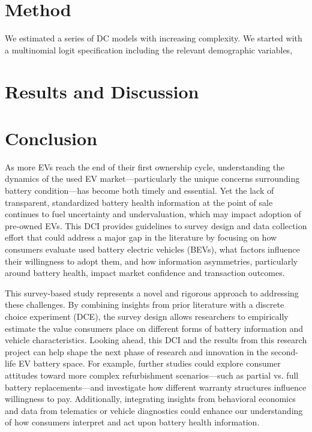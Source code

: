 \documentclass[a4paper,fleqn]{cas-sc}   %
\begin{document}
\section{Method}

We estimated a series of DC models with increasing complexity. We started with a multinomial logit specification including the relevant demographic variables,

\section{Results and Discussion}

\section{Conclusion}
As more EVs reach the end of their first ownership cycle, understanding the dynamics of the used EV market—particularly the unique concerns surrounding battery condition—has become both timely and essential. Yet the lack of transparent, standardized battery health information at the point of sale continues to fuel uncertainty and undervaluation, which may impact adoption of pre-owned EVs. This DCI provides guidelines to survey design and data collection effort that could address a major gap in the literature by focusing on how consumers evaluate used battery electric vehicles (BEVs), what factors influence their willingness to adopt them, and how information asymmetries, particularly around battery health, impact market confidence and transaction outcomes.

This survey-based study represents a novel and rigorous approach to addressing these challenges. By combining insights from prior literature with a discrete choice experiment (DCE), the survey design allows researchers to empirically estimate the value consumers place on different forms of battery information and vehicle characteristics. Looking ahead, this DCI and the results from this research project can help shape the next phase of research and innovation in the second-life EV battery space. For example, further studies could explore consumer attitudes toward more complex refurbishment scenarios—such as partial vs. full battery replacements—and investigate how different warranty structures influence willingness to pay. Additionally, integrating insights from behavioral economics and data from telematics or vehicle diagnostics could enhance our understanding of how consumers interpret and act upon battery health information.

\printcredits


\end{document}
